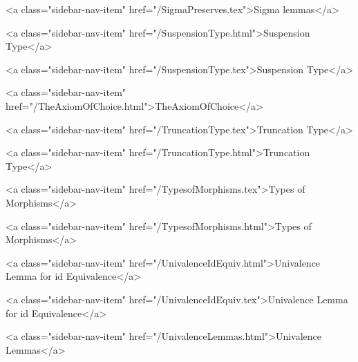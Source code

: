       
    
      
        
          <a class="sidebar-nav-item" href="/SigmaPreserves.tex">Sigma lemmas</a>
        
      
    
      
        
          <a class="sidebar-nav-item" href="/SuspensionType.html">Suspension Type</a>
        
      
    
      
        
          <a class="sidebar-nav-item" href="/SuspensionType.tex">Suspension Type</a>
        
      
    
      
        
          <a class="sidebar-nav-item" href="/TheAxiomOfChoice.html">TheAxiomOfChoice</a>
        
      
    
      
        
          <a class="sidebar-nav-item" href="/TruncationType.tex">Truncation Type</a>
        
      
    
      
        
          <a class="sidebar-nav-item" href="/TruncationType.html">Truncation Type</a>
        
      
    
      
        
          <a class="sidebar-nav-item" href="/TypesofMorphisms.tex">Types of Morphisms</a>
        
      
    
      
        
          <a class="sidebar-nav-item" href="/TypesofMorphisms.html">Types of Morphisms</a>
        
      
    
      
        
          <a class="sidebar-nav-item" href="/UnivalenceIdEquiv.html">Univalence Lemma for id Equivalence</a>
        
      
    
      
        
          <a class="sidebar-nav-item" href="/UnivalenceIdEquiv.tex">Univalence Lemma for id Equivalence</a>
        
      
    
      
        
          <a class="sidebar-nav-item" href="/UnivalenceLemmas.html">Univalence Lemmas</a>
        
